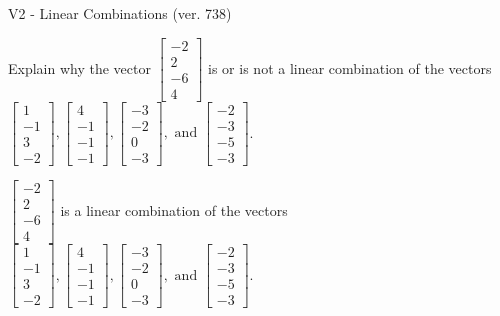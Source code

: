 \begin{exercise}
  \begin{exerciseTitle}V2 - Linear Combinations (ver. 738)\end{exerciseTitle}
  \begin{exerciseStatement}
    Explain why the vector \(\left[\begin{array}{c}
-2 \\
2 \\
-6 \\
4
\end{array}\right]\)  is or is not a linear 
	combination of the vectors \(\left[\begin{array}{c}
1 \\
-1 \\
3 \\
-2
\end{array}\right] , \left[\begin{array}{c}
4 \\
-1 \\
-1 \\
-1
\end{array}\right] , \left[\begin{array}{c}
-3 \\
-2 \\
0 \\
-3
\end{array}\right] , \text{ and } \left[\begin{array}{c}
-2 \\
-3 \\
-5 \\
-3
\end{array}\right]\).
	


  \end{exerciseStatement}
  \begin{exerciseAnswer}
   \(\left[\begin{array}{c}
-2 \\
2 \\
-6 \\
4
\end{array}\right]\) 
  	 is  
	a linear combination of the vectors \(\left[\begin{array}{c}
1 \\
-1 \\
3 \\
-2
\end{array}\right] , \left[\begin{array}{c}
4 \\
-1 \\
-1 \\
-1
\end{array}\right] , \left[\begin{array}{c}
-3 \\
-2 \\
0 \\
-3
\end{array}\right] , \text{ and } \left[\begin{array}{c}
-2 \\
-3 \\
-5 \\
-3
\end{array}\right]\).


\end{exerciseAnswer}
\end{exercise}
